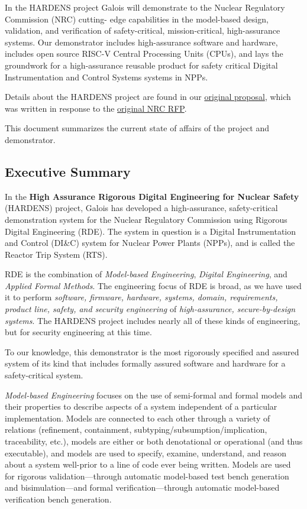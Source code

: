 \documentclass[11pt]{article}
\begin{document}
In the HARDENS project Galois will demonstrate to the Nuclear Regulatory
Commission (NRC) cutting- edge capabilities in the model-based design,
validation, and verification of safety-critical, mission-critical,
high-assurance systems. Our demonstrator includes high-assurance
software and hardware, includes open source RISC-V Central Processing
Units (CPUs), and lays the groundwork for a high-assurance reusable
product for safety critical Digital Instrumentation and Control Systems
systems in NPPs.

Details about the HARDENS project are found in our
\href{docs/HARDENS.pdf}{original proposal}, which was written in
response to the \href{docs/RFP.pdf}{original NRC RFP}.

This document summarizes the current state of affairs of the project and
demonstrator.

\hypertarget{executive-summary}{%
\subsection{Executive Summary}\label{executive-summary}}

In the \textbf{High Assurance Rigorous Digital Engineering for Nuclear
Safety} (HARDENS) project, Galois has developed a high-assurance,
safety-critical demonstration system for the Nuclear Regulatory
Commission using Rigorous Digital Engineering (RDE). The system in
question is a Digital Instrumentation and Control (DI\&C) system for
Nuclear Power Plants (NPPs), and is called the Reactor Trip System
(RTS).

RDE is the combination of \emph{Model-based Engineering}, \emph{Digital
Engineering}, and \emph{Applied Formal Methods}. The engineering focus
of RDE is broad, as we have used it to perform \emph{software, firmware,
hardware, systems, domain, requirements, product line, safety, and
security engineering} of \emph{high-assurance, secure-by-design
systems}. The HARDENS project includes nearly all of these kinds of
engineering, but for security engineering at this time.

To our knowledge, this demonstrator is the most rigorously specified and
assured system of its kind that includes formally assured software and
hardware for a safety-critical system.

\emph{Model-based Engineering} focuses on the use of semi-formal and
formal models and their properties to describe aspects of a system
independent of a particular implementation. Models are connected to each
other through a variety of relations (refinement, containment,
subtyping/subsumption/implication, traceability, etc.), models are
either or both denotational or operational (and thus executable), and
models are used to specify, examine, understand, and reason about a
system well-prior to a line of code ever being written. Models are used
for rigorous validation---through automatic model-based test bench
generation and bisimulation---and formal verification---through
automatic model-based verification bench generation.
\end{document}
